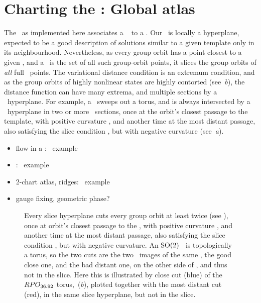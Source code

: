 
\section{Charting the \reducedsp: Global atlas}
\label{s:chart}


The \mslices\ as implemented here associates a \slice\ 
to a \template. Our \slice\ is locally a hyperplane, expected to be a
good description of solutions similar to a given template only in its
neighbourhood. Nevertheless, as every group orbit has a point closest to
a given \template, and a \slice\ is the set of all such group-orbit
points, it slices the group orbits of \emph{all} full \statesp\ points.
The variational distance condition  is an extremum
condition, and as the group orbits of highly nonlinear states are highly
contorted (see \,{\it b}), the distance function can
have many extrema, and multiple sections by a \slice\ hyperplane. For
example, a \rpo\ sweeps out a torus, and is always intersected by a
\slice\ hyperplane in two or more \po\ sections, once at the orbit's
closest passage to the template, with positive curvature ,
and another time at the most distant passage, also satisfying the slice
condition , but with negative curvature (see
\,{\it a}).


    \begin{itemize}
      \item flow in a \slice: \cLf\ example
      \item {\chartBord}: \cLf\ example
      \item 2-chart atlas, ridges:  \cLf\ example
      \item gauge fixing, geometric phase?
    \end{itemize}



\begin{figure}
   \centering
   \caption{\label{fig:sliceimage}
      Every slice hyperplane cuts every group orbit at least twice (see
      ), once at       orbit's closest passage to the
      {\template}, with positive curvature ,   and another
      time at the most distant passage, also satisfying the slice
      condition , but with negative curvature. An
      $\textrm{SO}(2)$ \rpo\ is topologically a torus, so the two cuts are the
      two \po\ images of the same \rpo, the good close one, and the bad
      distant one, on the other side of {\sset}, and thus not in the
      slice. Here this is illustrated by close cut (blue) of the \rpo\
      $RPO_{36.92}$ torus, \,({\it b}),
      plotted together with the most distant cut (red), in the same slice
      hyperplane, but not in the slice.
   }
\end{figure}


